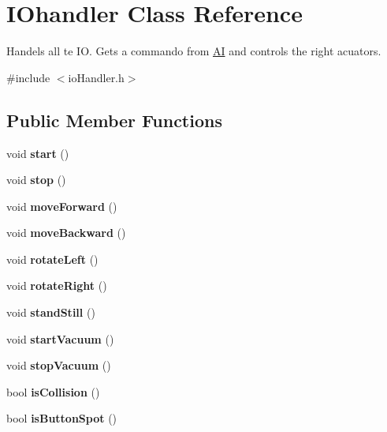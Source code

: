 \hypertarget{class_i_ohandler}{}\section{I\+Ohandler Class Reference}
\label{class_i_ohandler}


Handels all te IO. Gets a commando from \mbox{\hyperlink{class_a_i}{AI}} and controls the right acuators.  




{\ttfamily \#include $<$io\+Handler.\+h$>$}

\subsection*{Public Member Functions}
\begin{DoxyCompactItemize}
\item 
\mbox{\label{class_i_ohandler_ac70cba066f4fa2c826145ea504e318a9}} 
void {\bfseries start} ()
\item 
\mbox{\label{class_i_ohandler_a796e2c6a3a82cfc643d7804dabed0969}} 
void {\bfseries stop} ()
\item 
\mbox{\label{class_i_ohandler_a636a09b2cfeadd43f44316a52cbc5650}} 
void {\bfseries move\+Forward} ()
\item 
\mbox{\label{class_i_ohandler_ad77cb71263d8dfaf88f9a284077f32f7}} 
void {\bfseries move\+Backward} ()
\item 
\mbox{\label{class_i_ohandler_aceb8ab4c1afc3ad72fde370126748bd8}} 
void {\bfseries rotate\+Left} ()
\item 
\mbox{\label{class_i_ohandler_a02d24d84929b93007c50cff3ccd28501}} 
void {\bfseries rotate\+Right} ()
\item 
\mbox{\label{class_i_ohandler_abd77203571c6096df89c08d627ae4191}} 
void {\bfseries stand\+Still} ()
\item 
\mbox{\label{class_i_ohandler_a7db91fddbc8fbedb39f1b0fceba143f8}} 
void {\bfseries start\+Vacuum} ()
\item 
\mbox{\label{class_i_ohandler_a6b5bd2a60962ddb8b798b5ba47d1075c}} 
void {\bfseries stop\+Vacuum} ()
\item 
\mbox{\label{class_i_ohandler_ac0d655a812394751d5a7db68fb8b6e40}} 
bool {\bfseries is\+Collision} ()
\item 
\mbox{\label{class_i_ohandler_a32c44ac70a115d996ac138f90dcfebc1}} 
bool {\bfseries is\+Button\+Spot} ()
\end{DoxyCompactItemize}


